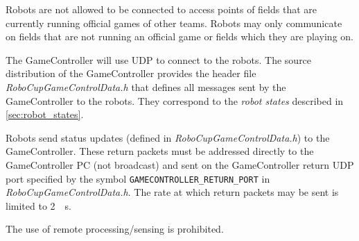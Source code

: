Robots are not allowed to be connected to access points of fields that are currently running official games of other teams.
Robots may only communicate on fields that are not running an official game or fields which they are playing on.

The GameController will use UDP to connect to the robots. The source distribution of the GameController provides the header file \emph{RoboCupGameControlData.h} that defines all messages sent by the GameController to the robots. They correspond to the \emph{robot states} described in \cref{sec:robot_states}.

Robots send status updates (defined in \emph{RoboCupGameControlData.h}) to the GameController. These return packets must be addressed directly to the GameController PC (\ie not broadcast) and sent on the GameController return UDP port specified by the symbol \verb!GAMECONTROLLER_RETURN_PORT! in \emph{RoboCupGameControlData.h}. The rate at which return packets may be sent is limited to \qty{2}{\per\second}.

The use of remote processing/sensing is prohibited.
